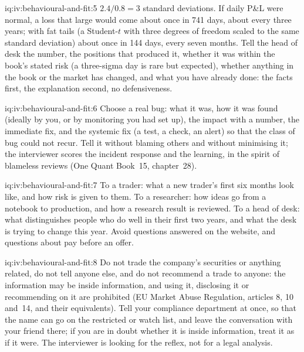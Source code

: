 \begin{solution}{iq:iv:behavioural-and-fit:5}
$2.4/0.8 = 3$ standard deviations. If daily P\&L were normal, a loss that large would come about once in 741 days, about every three
years; with fat tails (a Student-$t$ with three degrees of freedom scaled to the same standard deviation) about once in 144 days,
every seven months. Tell the head of desk the number, the positions that produced it, whether it was within the book's stated risk
(a three-sigma day is rare but expected), whether anything in the book or the market has changed, and what you have already done:
the facts first, the explanation second, no defensiveness.
\end{solution}

\begin{solution}{iq:iv:behavioural-and-fit:6}
Choose a real bug: what it was, how it was found (ideally by you, or by monitoring you had set up), the impact with a number, the
immediate fix, and the systemic fix (a test, a check, an alert) so that the class of bug could not recur. Tell it without blaming
others and without minimising it; the interviewer scores the incident response and the learning, in the spirit of blameless
reviews (One Quant Book~15, chapter~28).
\end{solution}

\begin{solution}{iq:iv:behavioural-and-fit:7}
To a trader: what a new trader's first six months look like, and how risk is given to them. To a researcher: how ideas go from a
notebook to production, and how a research result is reviewed. To a head of desk: what distinguishes people who do well in their
first two years, and what the desk is trying to change this year. Avoid questions answered on the website, and questions about pay
before an offer.
\end{solution}

\begin{solution}{iq:iv:behavioural-and-fit:8}
Do not trade the company's securities or anything related, do not tell anyone else, and do not recommend a trade to anyone: the
information may be inside information, and using it, disclosing it or recommending on it are prohibited (EU Market Abuse Regulation,
articles 8, 10 and~14, and their equivalents). Tell your compliance department at once, so that the name can go on the restricted
or watch list, and leave the conversation with your friend there; if you are in doubt whether it is inside information, treat it as
if it were. The interviewer is looking for the reflex, not for a legal analysis.
\end{solution}

